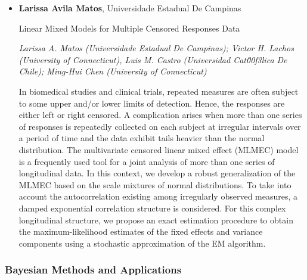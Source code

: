 \begin{itemize}
\item \textbf{Larissa Avila Matos}, Universidade Estadual De Campinas

Linear Mixed Models for Multiple Censored Responses Data

\emph{\footnotesize Larissa A. Matos (Universidade Estadual De Campinas); Victor H. Lachos (University of Connecticut),  Luis M. Castro (Universidad Cat\u00f3lica De Chile); Ming-Hui Chen (University of Connecticut)}

In biomedical studies and clinical trials, repeated measures are often subject to some upper and/or lower limits of detection. Hence, the responses are either left or right censored. A complication arises when more than one series of responses is repeatedly collected on each subject at irregular intervals over a period of time and the data exhibit tails heavier than the normal distribution. The multivariate censored linear mixed effect (MLMEC) model is a frequently used tool for a joint analysis of more than one series of longitudinal data. In this context, we develop a robust generalization of the MLMEC based on the scale mixtures of normal distributions. To take into account the autocorrelation existing among irregularly observed measures, a damped exponential correlation structure is considered. For this complex longitudinal structure, we propose an exact estimation procedure to obtain the maximum-likelihood estimates of the fixed effects and variance components using a stochastic approximation of the EM algorithm. 


\end{itemize}

\subsubsection*{Bayesian Methods and Applications}

